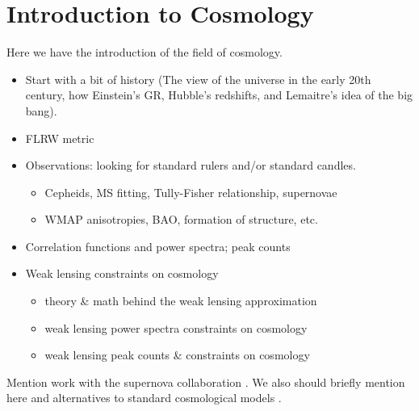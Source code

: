 \chapter{Introduction to Cosmology}

Here we have the introduction of the field of cosmology.

\begin{itemize}
\item Start with a bit of history (The view of the universe in the early 20th
century, how Einstein's GR,   Hubble's redshifts, and Lemaitre's idea of
the big bang).

\item FLRW metric

\item Observations: looking for standard rulers and/or standard candles.

  \begin{itemize}
    \item Cepheids, MS fitting, Tully-Fisher relationship, supernovae
    \item WMAP anisotropies, BAO, formation of structure, etc.
  \end{itemize}

\item Correlation functions and power spectra; peak counts

\item Weak lensing constraints on cosmology

  \begin{itemize}
    \item theory \& math behind the weak lensing approximation
    \item weak lensing power spectra constraints on cosmology
    \item weak lensing peak counts \& constraints on cosmology
  \end{itemize}

\end{itemize}

Mention work with the supernova collaboration \citep{Kessler2009}.
We also should briefly mention here \cite{Jain2011} and alternatives
to standard cosmological models \citep[also][]{Sollerman2009}.